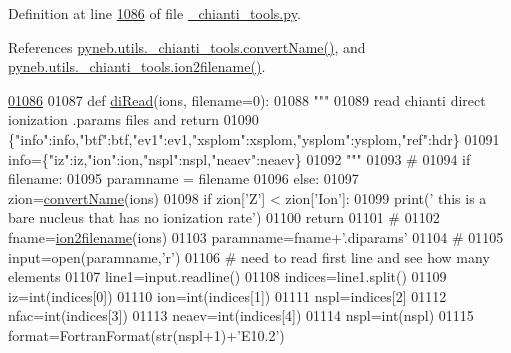 Definition at line \hyperlink{__chianti__tools_8py_source_l01086}{1086} of file \hyperlink{__chianti__tools_8py_source}{\-\_\-chianti\-\_\-tools.\-py}.



References \hyperlink{__chianti__tools_8py_source_l00353}{pyneb.\-utils.\-\_\-chianti\-\_\-tools.\-convert\-Name()}, and \hyperlink{__chianti__tools_8py_source_l00396}{pyneb.\-utils.\-\_\-chianti\-\_\-tools.\-ion2filename()}.


\begin{DoxyCode}
\hypertarget{namespacepyneb_1_1utils_1_1__chianti__tools_l01086}{}\hyperlink{namespacepyneb_1_1utils_1_1__chianti__tools_a28552b5d18a1b604ed4512c435e648bc}{01086} 
01087 \textcolor{keyword}{def }\hyperlink{namespacepyneb_1_1utils_1_1__chianti__tools_a28552b5d18a1b604ed4512c435e648bc}{diRead}(ions, filename=0):
01088     \textcolor{stringliteral}{"""}
01089 \textcolor{stringliteral}{    read chianti direct ionization .params files and return}
01090 \textcolor{stringliteral}{        \{"info":info,"btf":btf,"ev1":ev1,"xsplom":xsplom,"ysplom":ysplom,"ref":hdr\}}
01091 \textcolor{stringliteral}{        info=\{"iz":iz,"ion":ion,"nspl":nspl,"neaev":neaev\}}
01092 \textcolor{stringliteral}{    """}
01093     \textcolor{comment}{#}
01094     \textcolor{keywordflow}{if} filename:
01095         paramname = filename
01096     \textcolor{keywordflow}{else}:
01097         zion=\hyperlink{namespacepyneb_1_1utils_1_1__chianti__tools_a8038874902563556b0a8b536f52d3194}{convertName}(ions)
01098         \textcolor{keywordflow}{if} zion[\textcolor{stringliteral}{'Z'}] < zion[\textcolor{stringliteral}{'Ion'}]:
01099             print(\textcolor{stringliteral}{' this is a bare nucleus that has no ionization rate'})
01100             \textcolor{keywordflow}{return}
01101         \textcolor{comment}{#}
01102         fname=\hyperlink{namespacepyneb_1_1utils_1_1__chianti__tools_a7748521ca99103785680d691667ce851}{ion2filename}(ions)
01103         paramname=fname+\textcolor{stringliteral}{'.diparams'}
01104     \textcolor{comment}{#}
01105     input=open(paramname,\textcolor{stringliteral}{'}\textcolor{stringliteral}{r')}
01106 \textcolor{stringliteral}{    }\textcolor{comment}{#  need to read first line and see how many elements}
01107     line1=input.readline()
01108     indices=line1.split()
01109     iz=int(indices[0])
01110     ion=int(indices[1])
01111     nspl=indices[2]
01112     nfac=int(indices[3])
01113     neaev=int(indices[4])
01114     nspl=int(nspl)
01115     format=FortranFormat(str(nspl+1)+\textcolor{stringliteral}{'E10.2'})

\end{DoxyCode}
